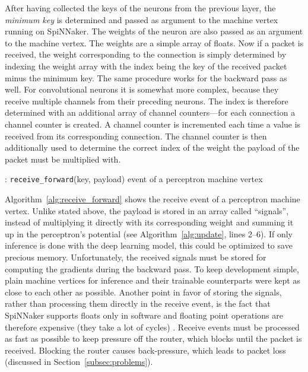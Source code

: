 \documentclass[]{article}
\begin{document}
After having collected the keys of the neurons from the previous
layer, the \textit{minimum key} is determined and passed as argument
to the machine vertex running on SpiNNaker.
The weights of the neuron are also passed as an argument to the
machine vertex.
The weights are a simple array of floats.
Now if a packet is received, the weight corresponding to the
connection is simply determined by indexing the weight array with the
index being the key of the received packet minus the minimum key.
The same procedure works for the backward pass as well.
For convolutional neurons it is somewhat more complex, because they
receive multiple channels from their preceding neurons.
The index is therefore determined with an additional array of channel
counters---for each connection a channel counter is created.
A channel counter is incremented each time a value is received from
its corresponding connection.
The channel counter is then additionally used to determine the correct
index of the weight the payload of the packet must be multiplied with.

\begin{algorithm} %
  \caption{: \texttt{receive\_forward}(key, payload) event of a
    perceptron machine vertex}
  \label{alg:receive_forward}

  \begin{algorithmic}[1]
  \end{algorithmic}
\end{algorithm} %

Algorithm~\ref{alg:receive_forward} shows the receive event of a
perceptron machine vertex.
Unlike stated above, the payload is stored in an array called
``signals'',
instead of multiplying it directly with its corresponding weight and
summing it up in the perceptron's potential
(see Algorithm~\ref{alg:update}, lines 2--6).
If only inference is done with the deep learning model, this could
be optimized to save precious memory.
Unfortunately, the received signals must be stored for computing the
gradients during the backward pass.
To keep development simple, plain machine vertices for inference and
their trainable counterparts were kept as close to each other as
possible.
Another point in favor of storing the signals, rather than processing
them directly in the receive event, is the fact that SpiNNaker
supports floats only in software and floating point operations are
therefore expensive (they take a lot of cycles)
\citep{furber_et_al_2020}.
Receive events must be processed as fast as possible to keep pressure
off the router, which blocks until the packet is received.
Blocking the router causes back-pressure, which leads to packet loss
(discussed in Section~\ref{subsec:problems}).
\end{document}
